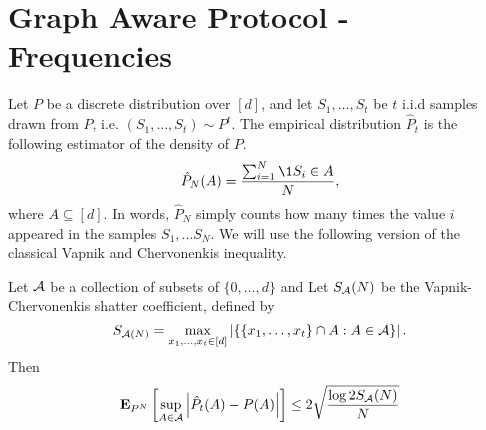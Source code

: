 \section{Graph Aware Protocol - Frequencies}
Let $P$ be a discrete distribution over $[d]$, and let
$S_1, \ldots, S_t$ be $t$ i.i.d samples drawn from $P$, i.e.
$(S_1, \ldots, S_t) \sim P^t$.
The empirical distribution $\hat{P}_t$ is the following estimator of
the density of $P$.
\begin{equation}\label{eq:empirical_distribution}
  \hat{P}_N(A) = \frac{\sum_{i=1}^N \1{S_i \in A}}{N},
\end{equation}
where $A \subseteq [d]$. In words, $\hat{P}_N$ simply counts
how many times the value $i$ appeared in the samples $S_1, \ldots S_N$.
We will use the following version of the classical Vapnik and
Chervonenkis inequality.
\begin{lemma}\label{l:vc_inequality}
  Let $\mathcal{A}$ be a collection of subsets of $\{0,\ldots, d\}$ and
  Let $S_{\mathcal{A}}(N)$ be the Vapnik-Chervonenkis shatter coefficient, defined
  by
  \[
    S_{\mathcal{A}(N)} = \max_{x_1,\ldots, x_t \in [d]}
    \left| \{ \{x_1, \ldots, x_t\} \cap A : A \in \mathcal{A} \} \right|.
  \]
  Then
  \[
    \bm{\mathrm{E}}_{P^N} \left[ \sup_{A \in \mathcal{A}} \left| \hat{P}_t(A) - P(A) \right| \right]
    \leq 2 \sqrt{\frac{\log{2 S_{\mathcal{A}}(N)}}{N}}
  \]
\end{lemma}

